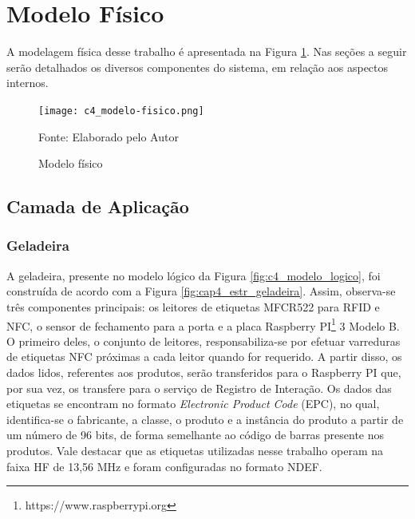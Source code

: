 
\section{Modelo F\'isico}


A modelagem física desse trabalho é apresentada na Figura \ref{fig:c4_modelo_fisico}. Nas seções a seguir serão detalhados os diversos componentes do sistema, em relação aos aspectos internos.


\begin{figure}[H]
    \caption{Modelo físico}
    \label{fig:c4_modelo_fisico}
    \texttt{[image: c4\_modelo-fisico.png]}
    
    \footnotesize{Fonte: Elaborado pelo Autor}
\end{figure}

\subsection{Camada de Aplicação}

\ProximoForaDoSumario 
\subsubsection{Geladeira}

A geladeira, presente no modelo lógico da Figura \ref{fig:c4_modelo_logico}, foi construída de acordo com a Figura \ref{fig:cap4_estr_geladeira}. Assim, observa-se três componentes principais: os leitores de etiquetas MFCR522 para RFID e NFC, o sensor de fechamento para a porta e a placa Raspberry PI\textsuperscript{\textregistered}\footnote{https://www.raspberrypi.org} 3 Modelo B. O primeiro deles, o conjunto de leitores, responsabiliza-se por efetuar varreduras de etiquetas NFC próximas a cada leitor quando for requerido. A partir disso, os dados lidos, referentes aos produtos, serão transferidos para o Raspberry PI que, por sua vez, os transfere para o serviço de Registro de Interação. Os dados das etiquetas se encontram no formato \textit{Electronic Product Code} (EPC), no qual, identifica-se o fabricante, a classe, o produto e a instância do produto a partir de um número de 96 bits, de forma semelhante ao código de barras presente nos produtos. Vale destacar que as etiquetas utilizadas nesse trabalho operam na faixa HF de 13,56 MHz e foram configuradas no formato NDEF.

